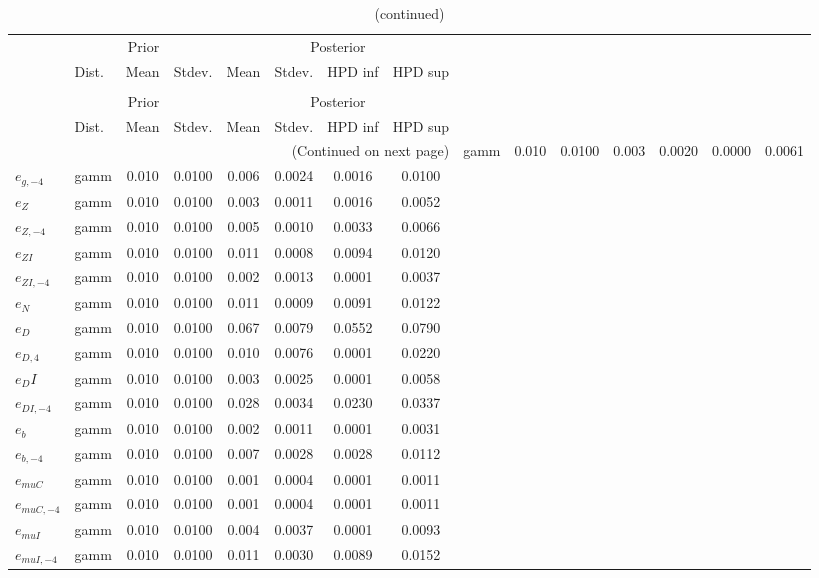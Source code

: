  
\begin{center}
\begin{longtable}{llcccccc} 
\caption{Results from Metropolis-Hastings (standard deviation of structural shocks)}
 \label{Table:MHPosterior:2}\\
\toprule 
  & \multicolumn{3}{c}{Prior}  &  \multicolumn{4}{c}{Posterior} \\
  \cmidrule(r{.75em}){2-4} \cmidrule(r{.75em}){5-8}
  & Dist. & Mean  & Stdev. & Mean & Stdev. & HPD inf & HPD sup\\
\midrule \endfirsthead 
\caption{(continued)}\\\toprule 
  & \multicolumn{3}{c}{Prior}  &  \multicolumn{4}{c}{Posterior} \\
  \cmidrule(r{.75em}){2-4} \cmidrule(r{.75em}){5-8}
  & Dist. & Mean  & Stdev. & Mean & Stdev. & HPD inf & HPD sup\\
\midrule \endhead 
\bottomrule \multicolumn{8}{r}{(Continued on next page)} \endfoot 
\bottomrule \endlastfoot 
${e_g}$ & gamm &   0.010 & 0.0100 &   0.003& 0.0020 &  0.0000 &  0.0061 \\ 
${e_{g,-4}}$ & gamm &   0.010 & 0.0100 &   0.006& 0.0024 &  0.0016 &  0.0100 \\ 
${e_Z}$ & gamm &   0.010 & 0.0100 &   0.003& 0.0011 &  0.0016 &  0.0052 \\ 
${e_{Z,-4}}$ & gamm &   0.010 & 0.0100 &   0.005& 0.0010 &  0.0033 &  0.0066 \\ 
${e_{ZI}}$ & gamm &   0.010 & 0.0100 &   0.011& 0.0008 &  0.0094 &  0.0120 \\ 
${e_{ZI,-4}}$ & gamm &   0.010 & 0.0100 &   0.002& 0.0013 &  0.0001 &  0.0037 \\ 
${e_N}$ & gamm &   0.010 & 0.0100 &   0.011& 0.0009 &  0.0091 &  0.0122 \\ 
${e_D}$ & gamm &   0.010 & 0.0100 &   0.067& 0.0079 &  0.0552 &  0.0790 \\ 
${e_{D,4}}$ & gamm &   0.010 & 0.0100 &   0.010& 0.0076 &  0.0001 &  0.0220 \\ 
${e_DI}$ & gamm &   0.010 & 0.0100 &   0.003& 0.0025 &  0.0001 &  0.0058 \\ 
${e_{DI,-4}}$ & gamm &   0.010 & 0.0100 &   0.028& 0.0034 &  0.0230 &  0.0337 \\ 
${e_b}$ & gamm &   0.010 & 0.0100 &   0.002& 0.0011 &  0.0001 &  0.0031 \\ 
${e_{b,-4}}$ & gamm &   0.010 & 0.0100 &   0.007& 0.0028 &  0.0028 &  0.0112 \\ 
${e_{muC}}$ & gamm &   0.010 & 0.0100 &   0.001& 0.0004 &  0.0001 &  0.0011 \\ 
${e_{muC,-4}}$ & gamm &   0.010 & 0.0100 &   0.001& 0.0004 &  0.0001 &  0.0011 \\ 
${e_{muI}}$ & gamm &   0.010 & 0.0100 &   0.004& 0.0037 &  0.0001 &  0.0093 \\ 
${e_{muI,-4}}$ & gamm &   0.010 & 0.0100 &   0.011& 0.0030 &  0.0089 &  0.0152 \\ 
\end{longtable}
 \end{center}
